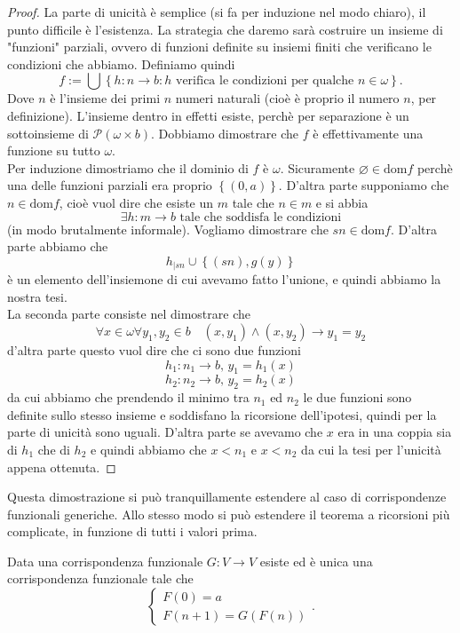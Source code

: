 \documentclass[11pt]{scrartcl}
\newcommand{\eset}{\varnothing}
\newcommand{\parti}[1]{\mathcal{P}\!\left(#1\right)}
\begin{document}
 	\begin{proof}
 		La parte di unicità è semplice (si fa per induzione nel modo chiaro), il punto difficile è l'esistenza. La strategia che daremo sarà costruire un insieme di "funzioni" parziali, ovvero di funzioni definite su insiemi finiti che verificano le condizioni che abbiamo. Definiamo quindi 
 		$$f:=\bigcup\left\{h:n\to b:h\,\,\text{verifica le condizioni per qualche $n\in\omega$}\right\}.$$
 		Dove $n$ è l'insieme dei primi $n$ numeri naturali (cioè è proprio il numero $n$, per definizione). L'insieme dentro in effetti esiste, perchè per separazione è un sottoinsieme di $\parti{\omega\times b}$. Dobbiamo dimostrare che $f$ è effettivamente una funzione su tutto $\omega$. \\
 		Per induzione dimostriamo che il dominio di $f$ è $\omega$. Sicuramente $\eset\in \text{dom}f$ perchè una delle funzioni parziali era proprio $\left\{(0,a)\right\}$. D'altra parte supponiamo che $n\in \text{dom}f$, cioè vuol dire che esiste un $m$ tale che $n\in m$ e si abbia
 		$$\exists h:m\to b \,\,\text{tale che soddisfa le condizioni}$$
 		(in modo brutalmente informale). Vogliamo dimostrare che $sn\in \text{dom}f$. D'altra parte abbiamo che
 		$$h_{|sn}\cup \left\{(sn),g(y)\right\}$$
 		è un elemento dell'insiemone di cui avevamo fatto l'unione, e quindi abbiamo la nostra tesi. \\
 		La seconda parte consiste nel dimostrare che 
 		$$\forall x\in \omega\forall y_1,y_2\in b \quad (x, y_1)\land(x,y_2)\to y_1=y_2$$
 		d'altra parte questo vuol dire che ci sono due funzioni 
 		$$h_1:n_1\to b,\, y_1=h_1(x) $$
 		$$h_2:n_2\to b,\, y_2=h_2(x) $$
 		da cui abbiamo che prendendo il minimo tra $n_1$ ed $n_2$ le due funzioni sono definite sullo stesso insieme e soddisfano la ricorsione dell'ipotesi, quindi per la parte di unicità sono uguali. D'altra parte se avevamo che $x$ era in una coppia sia di $h_1$ che di $h_2$ e quindi abbiamo che $x<n_1$ e $x<n_2$ da cui la tesi per l'unicità appena ottenuta.
 	\end{proof}
 	Questa dimostrazione si può tranquillamente estendere al caso di corrispondenze funzionali generiche. Allo stesso modo si può estendere il teorema a ricorsioni più complicate, in funzione di tutti i valori prima.
 	\begin{proposition}
 		Data una corrispondenza funzionale $G:V\to V$ esiste ed è unica una corrispondenza funzionale tale che
 		$$
 		\begin{cases}
 			F(0)=a \\
 			F(n+1)=G(F(n))
 		\end{cases}.
 		$$
 	\end{proposition}
\end{document}
